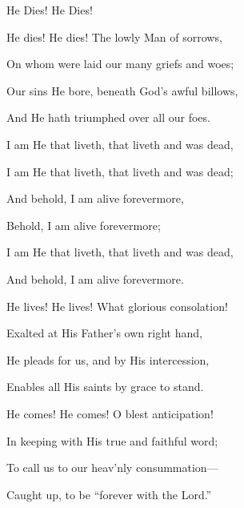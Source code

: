 \documentclass[12pt]{book}
\newcommand{\WBColBrk}{%
  \ifWordBk%
  \newpage%
\fi}
\begin{document}
\WBColBrk

\begin{song}{He Dies! He Dies!}{}
  {\SBPubDom}
  {}
  {}
  {}

  \begin{SBVerse}
    He dies! He dies! The lowly Man of sorrows,

    On whom were laid our many griefs and woes;

    Our sins He bore, beneath God's awful billows,

    And He hath triumphed over all our foes.
  \end{SBVerse}

  \begin{SBOpGroup}
    I am He that liveth, that liveth and was dead,

    I am He that liveth, that liveth and was dead;

    And behold, I am alive forevermore,

    Behold, I am alive forevermore;

    I am He that liveth, that liveth and was dead,

    And behold, I am alive forevermore.
  \end{SBOpGroup}

  \begin{SBVerse}
    He lives! He lives! What glorious consolation!

    Exalted at His Father's own right hand,

    He pleads for us, and by His intercession,

    Enables all His saints by grace to stand.
  \end{SBVerse}

  \begin{SBVerse}
    He comes! He comes! O blest anticipation!

    In keeping with His true and faithful word;

    To call us to our heav'nly consummation---

    Caught up, to be ``forever with the Lord.''
  \end{SBVerse}
\end{song}
\end{document}
